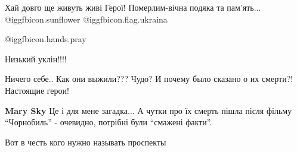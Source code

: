 \begin{itemize}
Хай довго ще живуть живі Герої! Померлим-вічна подяка та пам'ять... @igg{fbicon.sunflower} @igg{fbicon.flag.ukraina}

 @igg{fbicon.hands.pray} 

Низький уклін!!!!

Ничего себе..
Как они выжили??? Чудо?
И почему было сказано о их смерти?!
Настоящие герои!

\begin{itemize} %
\textbf{Mary Sky} Це і для мене загадка... А чутки про їх смерть пішла після
фільму \enquote{Чорнобиль} - очевидно, потрібні були \enquote{смажені факти}.
\end{itemize} %

Вот в честь кого нужно называть проспекты


\end{itemize} %

